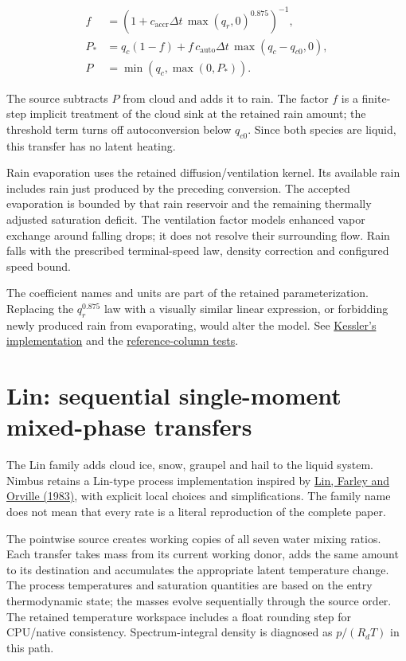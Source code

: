 \documentclass[
  11pt,
]{report}
\begin{document}
\[\begin{aligned}
f &= \left(1+c_{\mathrm{accr}}\Delta t\,
                  \max(q_r,0)^{0.875}\right)^{-1}, \\
P_* &= q_c(1-f)+f\,c_{\mathrm{auto}}\Delta t\,
                         \max(q_c-q_{c0},0), \\
P &= \min(q_c,\max(0,P_*)).
\end{aligned}\]

The source subtracts \(P\) from cloud and adds it to rain. The factor
\(f\) is a finite-step implicit treatment of the cloud sink at the
retained rain amount; the threshold term turns off autoconversion below
\(q_{c0}\). Since both species are liquid, this transfer has no latent
heating.

Rain evaporation uses the retained diffusion/ventilation kernel. Its
available rain includes rain just produced by the preceding conversion.
The accepted evaporation is bounded by that rain reservoir and the
remaining thermally adjusted saturation deficit. The ventilation factor
models enhanced vapor exchange around falling drops; it does not resolve
their surrounding flow. Rain falls with the prescribed terminal-speed
law, density correction and configured speed bound.

The coefficient names and units are part of the retained
parameterization. Replacing the \(q_r^{0.875}\) law with a visually
similar linear expression, or forbidding newly produced rain from
evaporating, would alter the model. See
\href{../src/microphysics/schemes/kessler/kessler.cpp}{Kessler's
implementation} and the
\href{../tests/qualification/test_kessler_reference_column.cpp}{reference-column
tests}.

\section{Lin: sequential single-moment mixed-phase
transfers}\label{lin-sequential-single-moment-mixed-phase-transfers}

The Lin family adds cloud ice, snow, graupel and hail to the liquid
system. Nimbus retains a Lin-type process implementation inspired by
\href{https://www.atmos.albany.edu/facstaff/rfovell/ATM562/lin-etal-1983.pdf}{Lin,
Farley and Orville (1983)}, with explicit local choices and
simplifications. The family name does not mean that every rate is a
literal reproduction of the complete paper.

The pointwise source creates working copies of all seven water mixing
ratios. Each transfer takes mass from its current working donor, adds
the same amount to its destination and accumulates the appropriate
latent temperature change. The process temperatures and saturation
quantities are based on the entry thermodynamic state; the masses evolve
sequentially through the source order. The retained temperature
workspace includes a float rounding step for CPU/native consistency.
Spectrum-integral density is diagnosed as \(p/(R_dT)\) in this path.
\end{document}
